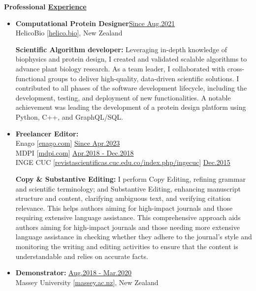 
{\bf\Large Professional \href{.}{Experience}}

\begin{itemize}


    \item {\bf Computational Protein Designer}\hfill \href{.}{Since Aug.2021}\\
          HelicoBio [\href{www.helico.bio}{helico.bio}],
          New Zealand

              {\noindent
                  \textbf{Scientific Algorithm developer:}
                  Leveraging in-depth knowledge of biophysics and protein design, I created and validated scalable algorithms to advance plant biology research. As a team leader, I collaborated with cross-functional groups to deliver high-quality, data-driven scientific solutions. I contributed to all phases of the software development lifecycle, including the development, testing, and deployment of new functionalities. A notable achievement was leading the development of a protein design platform using Python, C++, and GraphQL/SQL.
              }

    \item {\bf Freelancer Editor:}\\
          Enago [\href{https://www.enago.com/}{enago.com}] \hfill
          \href{.}{Since Apr.2023}\\
          MDPI [\href{https://www.mdpi.com/}{mdpi.com}] \hfill
          \href{.}{Apr.2018 - Dec.2018}\\
          INGE CUC [\href{https://revistascientificas.cuc.edu.co/index.php/ingecuc}{revistascientificas.cuc.edu.co/index.php/ingecuc}] \hfill
          \href{.}{Dec.2015}

          {\noindent
              \textbf{Copy \& Substantive Editing:}
              I perform Copy Editing, refining grammar and scientific terminology; and Substantive Editing, enhancing manuscript structure and content, clarifying ambiguous text, and verifying citation relevance. This helps authors aiming for high-impact journals and those requiring extensive language assistance. This comprehensive approach aids authors aiming for high-impact journals and those needing more extensive language assistance in checking whether they adhere to the journal's style and monitoring the writing and editing activities to ensure that the content is understandable and relies on accurate facts.
          }

    \item {\bf Demonstrator:} \hfill \href{.}{Aug.2018 - Mar.2020}\\
          Massey University [\href{www.massey.ac.nz}{massey.ac.nz}],
          New Zealand


\end{itemize}
